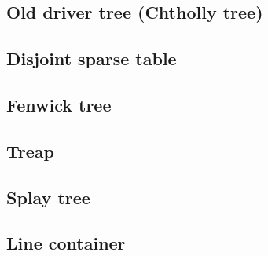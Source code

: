 \subsection{Old driver tree (Chtholly tree)}

\subsection{Disjoint sparse table}

\subsection{Fenwick tree}

\subsection{Treap}

\subsection{Splay tree}

\subsection{Line container}
